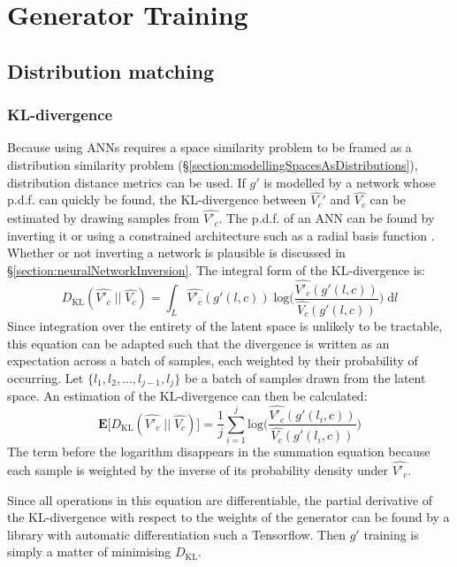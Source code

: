 \documentclass[../../main.tex]{subfiles}
\begin{document}
\chapter{Generator Training} \label{chapter:generatorTraining}

\section{Distribution matching} \label{section:distributionMatching}

\subsection{KL-divergence} \label{subsection:klDivergence}

Because using ANNs requires a space similarity problem to be framed as a distribution similarity problem (\S\ref{section:modellingSpacesAsDistributions}), distribution distance metrics can be used.
If $g'$ is modelled by a network whose p.d.f. can quickly be found, the KL-divergence between $\hat{V_c}'$ and $\hat{V_c}$ can be estimated by drawing samples from $\hat{V'_c}$.
The p.d.f. of an ANN can be found by inverting it or using a constrained architecture such as a radial basis function \cite{park91}.
Whether or not inverting a network is plausible is discussed in \S\ref{section:neuralNetworkInversion}.
The integral form of the KL-divergence is:
\begin{equation}
    D_{\text{KL}}(\hat{V'_c}\;||\;\hat{V_c})=\int_L\hat{V'_c}(g'(l,c))\;\text{log}\bigg(\frac{\hat{V'_c}(g'(l,c))}{\hat{V_c}(g'(l,c))}\bigg)\;\mathrm{d}l
\end{equation}
Since integration over the entirety of the latent space is unlikely to be tractable, this equation can be adapted such that the divergence is written as an expectation across a batch of samples, each weighted by their probability of occurring.
Let $\{l_1,l_2,...,l_{j-1},l_j\}$ be a batch of samples drawn from the latent space.
An estimation of the KL-divergence can then be calculated:
\begin{equation}
    \textbf{E}\big[D_{\text{KL}}(\hat{V'_c}\;||\;\hat{V_c})\big]=\frac{1}{j}\sum_{i=1}^{j}\text{log}\bigg(\frac{\hat{V'_c}(g'(l_i,c))}{\hat{V_c}(g'(l_i,c))}\bigg)
\end{equation}
The term before the logarithm disappears in the summation equation because each sample is weighted by the inverse of its probability density under $\hat{V'_c}$.

Since all operations in this equation are differentiable, the partial derivative of the KL-divergence with respect to the weights of the generator can be found by a library with automatic differentiation such a Tensorflow.
Then $g'$ training is simply a matter of minimising $D_\text{KL}$.
\end{document}
